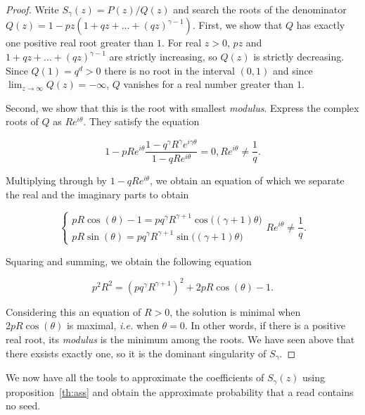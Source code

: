 \documentclass{article}
\begin{document}
\begin{proof}
Write $S_\gamma(z) = P(z)/Q(z)$ and search the roots of the denominator
$Q(z) = 1-pz(1+qz+\ldots+(qz)^{\gamma-1})$.
First, we show that $Q$ has exactly one positive real root greater than
$1$. For real $z > 0$, $pz$ and $1+qz+\ldots+(qz)^{\gamma-1}$ are strictly
increasing, so $Q(z)$ is strictly decreasing. Since $Q(1) = q^d > 0$ there
is no root in the interval $(0,1)$ and since $\lim_{z\rightarrow \infty}
Q(z) = -\infty$, $Q$ vanishes for a real number greater than $1$.

Second, we show that this is the root with smallest \textit{modulus}.
Express the complex roots of $Q$ as $Re^{i\theta}$. They satisfy the
equation

\begin{equation*}
1-pRe^{i\theta}\frac{1-q^\gamma R^\gamma
e^{i\gamma\theta}}{1-qRe^{i\theta}} = 0,
Re^{i\theta} \neq \frac{1}{q}.
\end{equation*}

Multiplying through by $1-qRe^{i\theta}$, we obtain an equation of which
we separate the real and the imaginary parts to obtain

\begin{equation*}
\left\{
\begin{array}{ll}
pR \cos (\theta) -1 = pq^\gamma R^{\gamma+1}
\cos \big( (\gamma+1) \theta \big) \\
pR \sin (\theta) = pq^\gamma R^{\gamma+1}
\sin \big( (\gamma+1) \theta \big)
\end{array}
\right. Re^{i\theta} \neq \frac{1}{q}.
\end{equation*}

Squaring and summing, we obtain the following equation

\begin{equation}
\label{eq:Reitheta}
p^2R^2 = (pq^\gamma R^{\gamma+1})^2 + 2pR \cos(\theta) -1.
\end{equation}

Considering this an equation of $R > 0$, the solution is minimal when
$2pR\cos(\theta)$ is maximal, \textit{i.e.} when $\theta = 0$. In other
words, if there is a positive real root, its \textit{modulus} is the
minimum among the roots. We have seen above that there exsists exactly
one, so it is the dominant singularity of $S_\gamma$.
\end{proof}

We now have all the tools to approximate the coefficients of $S_\gamma(z)$
using proposition~\ref{th:ass} and obtain the approximate probability that
a read contains no seed.
\end{document}
